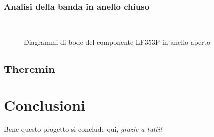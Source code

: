 \documentclass[titlepage]{report}
\begin{document}
	\subsection{Analisi della banda in anello chiuso}
	     \begin{figure}[h]
	     	\centering
	     	 \qquad
	     	 \\
	     	\caption{Diagrammi di bode del componente LF353P in anello aperto}
	     	\label{fig:bode_LF353P}
	     \end{figure}
     	
\section{Theremin}
	
	
\chapter{Conclusioni}
 	\label{ch:Conclusioni}
	Bene questo progetto si conclude qui, \textit{grazie a tutti!}
	
	
\end{document}
